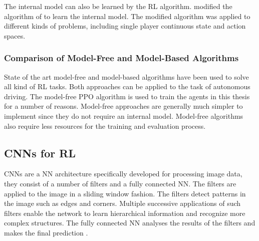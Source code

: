 The internal model can also be learned by the \ac{RL} algorithm. \textcite{alphagoimprovementmuzero} modified the algorithm of \textcite{alphago} to learn the internal model. The modified algorithm was applied to different kinds of problems, including single player continuous state and action spaces. 




\subsubsection{Comparison of Model-Free and Model-Based Algorithms}

State of the art model-free and model-based algorithms have been used to solve all kind of \ac{RL} tasks. Both approaches can be applied to the task of autonomous driving. The model-free \ac{PPO} algorithm is used to train the agents in this thesis for a number of reasons. Model-free approaches are generally much simpler to implement since they do not require an internal model. Model-free algorithms also require less resources for the training and evaluation process.




\subsection{\acp{CNN} for \ac{RL}}

\acp{CNN} are a \ac{NN} architecture specifically developed for processing image data, they consist of a number of filters and a fully connected \ac{NN}. The filters are applied to the image in a sliding window fashion. The filters detect patterns in the image such as edges and corners. Multiple successive applications of such filters enable the network to learn hierarchical information and recognize more complex structures. The fully connected \ac{NN} analyses the results of the filters and makes the final prediction \textcite{rlbook2020}.

